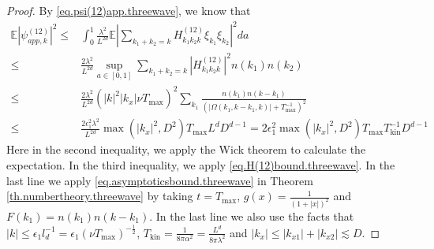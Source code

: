 \begin{proof}
By \eqref{eq.psi(12)app.threewave}, we know that 
\begin{equation}\label{eq.psi(12)bound.threewave}
\begin{split}
    \mathbb E \left|\psi^{(12)}_{app,k}\right|^2\le& \int^1_{0}\frac{\lambda^2}{L^{2d}} \mathbb E\left|\sum\limits_{k_1+k_2=k} H^{(12)}_{k_1k_2k}\xi_{k_1} \xi_{k_2}\right|^2 da 
    \\
    \le& \frac{2\lambda^2}{L^{2d}} \sup_{a\in[0,1]}\sum\limits_{k_1+k_2=k} \left|H^{(12)}_{k_1k_2k}\right|^2n(k_1) n(k_2)
    \\
    \le& \frac{2\lambda^2}{L^{2d}} (|k|^2|k_x|\nu T_{\text{max}})^2 \sum\limits_{k_1} \frac{n(k_1) n(k-k_1)}{(|\Omega(k_1,k-k_1,k)|+T^{-1}_{\text{max}})^2}
    \\
    \le& \frac{2\epsilon_1^2\lambda^2}{L^{2d}} \max(|k_x|^2,D^2) T_{\text{max}} L^dD^{d-1}=2\epsilon_1^2 \max(|k_x|^2,D^2) T_{\text{max}} T^{-1}_{\text{kin}}D^{d-1} 
\end{split}   
\end{equation}
Here in the second inequality, we apply the Wick theorem to calculate the expectation. In the third inequality, we apply \eqref{eq.H(12)bound.threewave}. In the last line we apply \eqref{eq.asymptoticsbound.threewave} in Theorem \ref{th.numbertheory.threewave} by taking $t=T_{\text{max}}$, $g(x)=\frac{1}{(1+|x|)^2}$ and $F(k_1)=n(k_1) n(k-k_1)$. In the last line we also use the facts that $|k|\le \epsilon_1 l_{d}^{-1}=\epsilon_1 (\nu T_{\text{max}})^{-\frac{1}{2}}$, $T_{\text{kin}}=\frac{1}{8\pi\alpha^2}=\frac{L^{d}}{8\pi\lambda^2}$ and $|k_x|\le |k_{x1}|+|k_{x2}|\lesssim D$.


\end{proof}
